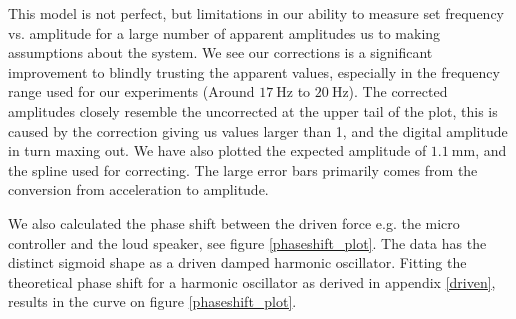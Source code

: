 \documentclass[12pt,oneside,a4paper]{article}
\numberwithin{equation}{section}
\begin{document}
{{{{\begin{figure}[h]
\begin{subfigure}[t]{0.49\textwidth}
	\end{subfigure}
\end{figure}
This model is not perfect, but limitations in our ability to measure set frequency vs. amplitude for a large number of apparent amplitudes  us to making assumptions about the system. We see our corrections is a significant improvement to blindly trusting the apparent values, especially in the frequency range used for our experiments (Around $\SI{17}{\hertz}$ to $\SI{20}{\hertz}$). The corrected amplitudes closely resemble the uncorrected at the upper tail of the plot, this is caused by the correction giving us values larger than 1, and the digital amplitude in turn maxing out. We have also plotted the expected amplitude of $\SI{1.1}{\mm}$, and the spline used for correcting. The large error bars primarily comes from the conversion from acceleration to amplitude.

We also calculated the phase shift between the driven force e.g. the micro controller and the loud speaker, see figure \ref{phaseshift_plot}. The data has the distinct sigmoid shape as a driven damped harmonic oscillator. Fitting the theoretical phase shift for a harmonic oscillator as derived in appendix \ref{driven}, results in the curve on figure \ref{phaseshift_plot}.
 
\begin{figure}[h]
	\centering
	\begin{subfigure}[t]{0.49\textwidth}
		

\end{subfigure}
\end{figure}}}}}
\end{document}
